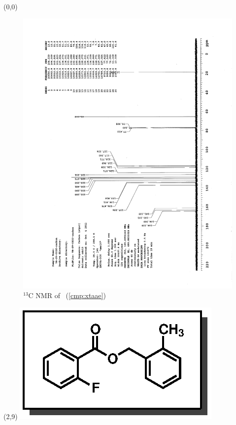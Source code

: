 \clearpage
\begin{textblock}{20}(0,0)
\begin{figure}[htb]
\caption{$^{13}$C NMR of  \CMPxtaae\ (\ref{cmp:xtaae})}
\includegraphics[scale=0.75, trim = 0mm 0mm 0mm 5mm,
clip]{chp_asymmetric/images/nmr/xtaaeC}
\vspace{-100pt}
\end{figure}
\end{textblock}
\begin{textblock}{1}(2,9)
\includegraphics[scale=0.8, angle=90]{chp_asymmetric/images/xtaae}
\end{textblock}
